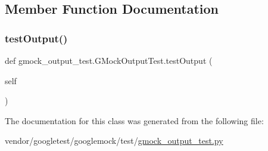 \subsection{Member Function Documentation}
\mbox{\label{classgmock__output__test_1_1_g_mock_output_test_a661e7846690f48328fd9e0834fde9980}} 
\subsubsection{\texorpdfstring{test\+Output()}{testOutput()}}
{\footnotesize\ttfamily def gmock\+\_\+output\+\_\+test.\+G\+Mock\+Output\+Test.\+test\+Output (\begin{DoxyParamCaption}\item[{}]{self }\end{DoxyParamCaption})}



The documentation for this class was generated from the following file\+:\begin{DoxyCompactItemize}
\item 
vendor/googletest/googlemock/test/\hyperlink{gmock__output__test_8py}{gmock\+\_\+output\+\_\+test.\+py}\end{DoxyCompactItemize}
